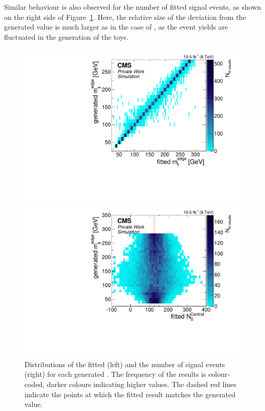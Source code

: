 Similar behaviour is also observed for the number of fitted signal events, as shown on the right side of Figure~\ref{fig:toys:scan}. Here, the relative size of the deviation from the generated value is much larger as in the case of \mlledge, as the event yields are fluctuated in the generation of the toys. 
\begin{figure}[htbp]
  \centering
  \begin{minipage}[t]{0.49\textwidth}
    \includegraphics[width=\textwidth]{plots/results/fit/toyResults/generatedM0vsfittedM0_signalInjectedN125.pdf}
  \end{minipage}
  \begin{minipage}[t]{0.49\textwidth}
    \includegraphics[width=\textwidth]{plots/results/fit/toyResults/generatedM0vsfittedNS_signalInjectedN125.pdf}
  \end{minipage}
  \caption{Distributions of the fitted \mlledge (left) and the number of signal events (right) for each generated \mlledge. The frequency of the results is colour-coded, darker colours indicating higher values. The dashed red lines indicate the points at which the fitted result matches the generated value.}
    \label{fig:toys:scan}
\end{figure}

